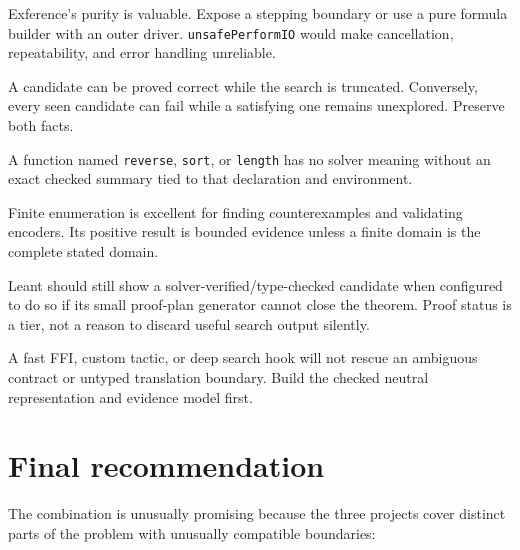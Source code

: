 \documentclass[11pt,oneside]{article}
\newcommand{\code}[1]{\texttt{#1}}
\begin{document}
\begin{riskbox}[title=Do not hide solver IO inside pure search]
Exference's purity is valuable. Expose a stepping boundary or use a pure formula builder
with an outer driver. \code{unsafePerformIO} would make cancellation, repeatability,
and error handling unreliable.
\end{riskbox}

\begin{riskbox}[title=Do not confuse candidate proof with search completeness]
A candidate can be proved correct while the search is truncated. Conversely, every
seen candidate can fail while a satisfying one remains unexplored. Preserve both facts.
\end{riskbox}

\begin{riskbox}[title=Do not treat provider names as semantics]
A function named \code{reverse}, \code{sort}, or \code{length} has no solver meaning
without an exact checked summary tied to that declaration and environment.
\end{riskbox}

\begin{riskbox}[title=Do not call bounded testing a theorem]
Finite enumeration is excellent for finding counterexamples and validating encoders.
Its positive result is bounded evidence unless a finite domain is the complete stated
domain.
\end{riskbox}

\begin{riskbox}[title=Do not make proof reconstruction all-or-nothing]
Leant should still show a solver-verified/type-checked candidate when configured to do
so if its small proof-plan generator cannot close the theorem. Proof status is a tier,
not a reason to discard useful search output silently.
\end{riskbox}

\begin{riskbox}[title=Do not optimize before establishing a stable semantic IR]
A fast FFI, custom tactic, or deep search hook will not rescue an ambiguous contract or
untyped translation boundary. Build the checked neutral representation and evidence
model first.
\end{riskbox}

\section{Final recommendation}

The combination is unusually promising because the three projects cover distinct
parts of the problem with unusually compatible boundaries:
\end{document}
